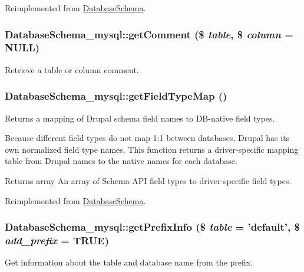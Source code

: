 Reimplemented from \hyperlink{classDatabaseSchema_ae4de35c98eed09a4c38d82e3f17ed8a6}{DatabaseSchema}.\hypertarget{classDatabaseSchema__mysql_aff75d99144376d1dabbec862c206a645}{
\subsubsection[{getComment}]{\setlength{\rightskip}{0pt plus 5cm}DatabaseSchema\_\-mysql::getComment (\$ {\em table}, \/  \$ {\em column} = {\ttfamily NULL})}}
\label{classDatabaseSchema__mysql_aff75d99144376d1dabbec862c206a645}
Retrieve a table or column comment. \hypertarget{classDatabaseSchema__mysql_abe6bab05d4dca80ecad5fcd0fb17145e}{
\subsubsection[{getFieldTypeMap}]{\setlength{\rightskip}{0pt plus 5cm}DatabaseSchema\_\-mysql::getFieldTypeMap ()}}
\label{classDatabaseSchema__mysql_abe6bab05d4dca80ecad5fcd0fb17145e}
Returns a mapping of Drupal schema field names to DB-\/native field types.

Because different field types do not map 1:1 between databases, Drupal has its own normalized field type names. This function returns a driver-\/specific mapping table from Drupal names to the native names for each database.

\begin{DoxyReturn}{Returns}
array An array of Schema API field types to driver-\/specific field types. 
\end{DoxyReturn}


Reimplemented from \hyperlink{classDatabaseSchema_a82022c76c3131c4d745736d08321b788}{DatabaseSchema}.\hypertarget{classDatabaseSchema__mysql_a83aac7da38db04087cd040d93facf5e7}{
\subsubsection[{getPrefixInfo}]{\setlength{\rightskip}{0pt plus 5cm}DatabaseSchema\_\-mysql::getPrefixInfo (\$ {\em table} = {\ttfamily 'default'}, \/  \$ {\em add\_\-prefix} = {\ttfamily TRUE})}}
\label{classDatabaseSchema__mysql_a83aac7da38db04087cd040d93facf5e7}
Get information about the table and database name from the prefix.

